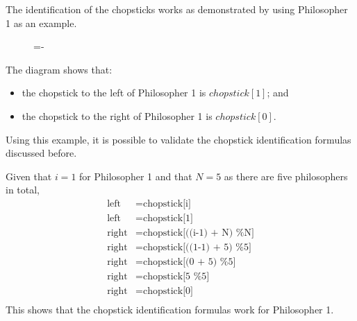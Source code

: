 \documentclass[a4paper]{systems-software}
\begin{document}
The identification of the chopsticks works as demonstrated by using Philosopher 1 as an example.

\begin{figure}[H]
  \lineskip=-\fboxrule
\end{figure}

The diagram shows that:
\begin{itemize}
	\item the chopstick to the left of Philosopher 1 is $chopstick[1]$; and
	\item the chopstick to the right of Philosopher 1 is $chopstick[0]$.
\end{itemize}

Using this example, it is possible to validate the chopstick identification formulas discussed before.

Given that $i = 1$ for Philosopher 1 and that $N = 5$ as there are five philosophers in total,
\begin{equation*}
	\begin{aligned}
		\text{left} & = \text{chopstick[i]} \\
		\text{left} & = \text{chopstick[1]} \\
		\text{right} & = \text{chopstick[((i-1) + N) \% N]} \\
		\text{right} & = \text{chopstick[((1-1) + 5) \% 5]} \\
		\text{right} & = \text{chopstick[(0 + 5) \% 5]} \\
		\text{right} & = \text{chopstick[5 \% 5]} \\
		\text{right} & = \text{chopstick[0]} \\
	\end{aligned}
\end{equation*}
This shows that the chopstick identification formulas work for Philosopher 1.
\end{document}
